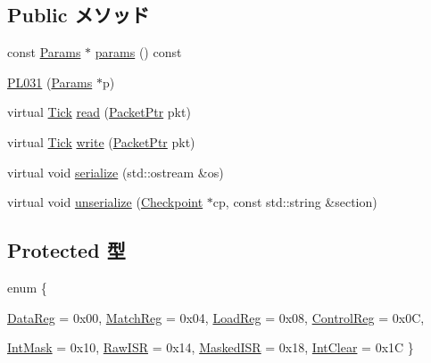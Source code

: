 \subsection*{Public メソッド}
\begin{DoxyCompactItemize}
\item 
const \hyperlink{classPL031_acd44fa02a8cc03d321b406d70faea0d8}{Params} $\ast$ \hyperlink{classPL031_acd3c3feb78ae7a8f88fe0f110a718dff}{params} () const 
\item 
\hyperlink{classPL031_a2806576b9665b3919c8528247f5b8687}{PL031} (\hyperlink{classPL031_acd44fa02a8cc03d321b406d70faea0d8}{Params} $\ast$p)
\item 
virtual \hyperlink{base_2types_8hh_a5c8ed81b7d238c9083e1037ba6d61643}{Tick} \hyperlink{classPL031_a613ec7d5e1ec64f8d21fec78ae8e568e}{read} (\hyperlink{classPacket}{PacketPtr} pkt)
\item 
virtual \hyperlink{base_2types_8hh_a5c8ed81b7d238c9083e1037ba6d61643}{Tick} \hyperlink{classPL031_a4cefab464e72b5dd42c003a0a4341802}{write} (\hyperlink{classPacket}{PacketPtr} pkt)
\item 
virtual void \hyperlink{classPL031_a53e036786d17361be4c7320d39c99b84}{serialize} (std::ostream \&os)
\item 
virtual void \hyperlink{classPL031_af22e5d6d660b97db37003ac61ac4ee49}{unserialize} (\hyperlink{classCheckpoint}{Checkpoint} $\ast$cp, const std::string \&section)
\end{DoxyCompactItemize}
\subsection*{Protected 型}
\begin{DoxyCompactItemize}
\item 
enum \{ \par
\hyperlink{classPL031_ac205be2172292384dd687b5471a87edda03046e49305fe7cb28a7443123b7b714}{DataReg} =  0x00, 
\hyperlink{classPL031_ac205be2172292384dd687b5471a87edda531ff84a3060a2e55cdff3e6f755a761}{MatchReg} =  0x04, 
\hyperlink{classPL031_ac205be2172292384dd687b5471a87eddaf1b4cf2000c66476aa951689a85d5843}{LoadReg} =  0x08, 
\hyperlink{classPL031_ac205be2172292384dd687b5471a87edda794a3f84717e8b4e7c8af89cbe9f7441}{ControlReg} =  0x0C, 
\par
\hyperlink{classPL031_ac205be2172292384dd687b5471a87edda76b304d6b82468e9fef045318f59fbf0}{IntMask} =  0x10, 
\hyperlink{classPL031_ac205be2172292384dd687b5471a87eddabd636a57d30c6af5f7a2eabb4e4258cd}{RawISR} =  0x14, 
\hyperlink{classPL031_ac205be2172292384dd687b5471a87edda84e908ced233cc8a35eabafa2c2acf93}{MaskedISR} =  0x18, 
\hyperlink{classPL031_ac205be2172292384dd687b5471a87eddadba6b9695c70b08e0a47bf9b1c0eaeab}{IntClear} =  0x1C
 \}
\end{DoxyCompactItemize}
